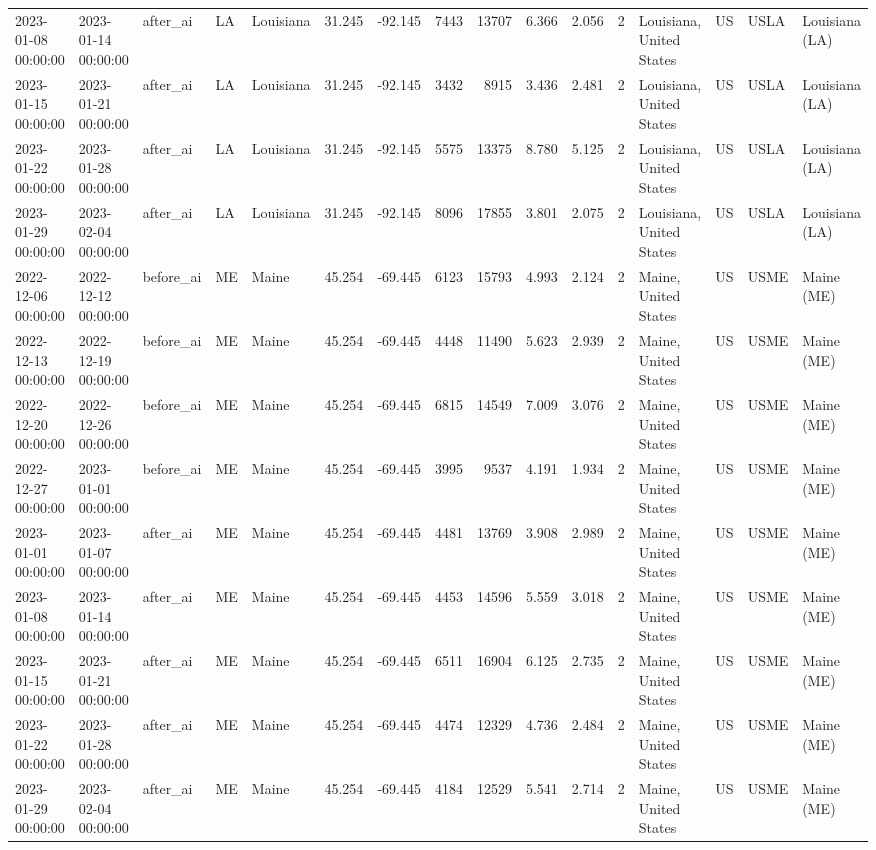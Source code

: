 \begin{tabular}{lllllrrrrrrlllll}
2023-01-08 00:00:00 & 2023-01-14 00:00:00 & after\_ai & LA & Louisiana & 31.245 & -92.145 & 7443 & 13707 & 6.366 & 2.056 & 2 & Louisiana, United States & US & USLA & Louisiana (LA) \\
2023-01-15 00:00:00 & 2023-01-21 00:00:00 & after\_ai & LA & Louisiana & 31.245 & -92.145 & 3432 & 8915 & 3.436 & 2.481 & 2 & Louisiana, United States & US & USLA & Louisiana (LA) \\
2023-01-22 00:00:00 & 2023-01-28 00:00:00 & after\_ai & LA & Louisiana & 31.245 & -92.145 & 5575 & 13375 & 8.780 & 5.125 & 2 & Louisiana, United States & US & USLA & Louisiana (LA) \\
2023-01-29 00:00:00 & 2023-02-04 00:00:00 & after\_ai & LA & Louisiana & 31.245 & -92.145 & 8096 & 17855 & 3.801 & 2.075 & 2 & Louisiana, United States & US & USLA & Louisiana (LA) \\
2022-12-06 00:00:00 & 2022-12-12 00:00:00 & before\_ai & ME & Maine & 45.254 & -69.445 & 6123 & 15793 & 4.993 & 2.124 & 2 & Maine, United States & US & USME & Maine (ME) \\
2022-12-13 00:00:00 & 2022-12-19 00:00:00 & before\_ai & ME & Maine & 45.254 & -69.445 & 4448 & 11490 & 5.623 & 2.939 & 2 & Maine, United States & US & USME & Maine (ME) \\
2022-12-20 00:00:00 & 2022-12-26 00:00:00 & before\_ai & ME & Maine & 45.254 & -69.445 & 6815 & 14549 & 7.009 & 3.076 & 2 & Maine, United States & US & USME & Maine (ME) \\
2022-12-27 00:00:00 & 2023-01-01 00:00:00 & before\_ai & ME & Maine & 45.254 & -69.445 & 3995 & 9537 & 4.191 & 1.934 & 2 & Maine, United States & US & USME & Maine (ME) \\
2023-01-01 00:00:00 & 2023-01-07 00:00:00 & after\_ai & ME & Maine & 45.254 & -69.445 & 4481 & 13769 & 3.908 & 2.989 & 2 & Maine, United States & US & USME & Maine (ME) \\
2023-01-08 00:00:00 & 2023-01-14 00:00:00 & after\_ai & ME & Maine & 45.254 & -69.445 & 4453 & 14596 & 5.559 & 3.018 & 2 & Maine, United States & US & USME & Maine (ME) \\
2023-01-15 00:00:00 & 2023-01-21 00:00:00 & after\_ai & ME & Maine & 45.254 & -69.445 & 6511 & 16904 & 6.125 & 2.735 & 2 & Maine, United States & US & USME & Maine (ME) \\
2023-01-22 00:00:00 & 2023-01-28 00:00:00 & after\_ai & ME & Maine & 45.254 & -69.445 & 4474 & 12329 & 4.736 & 2.484 & 2 & Maine, United States & US & USME & Maine (ME) \\
2023-01-29 00:00:00 & 2023-02-04 00:00:00 & after\_ai & ME & Maine & 45.254 & -69.445 & 4184 & 12529 & 5.541 & 2.714 & 2 & Maine, United States & US & USME & Maine (ME) \\

\end{tabular}
